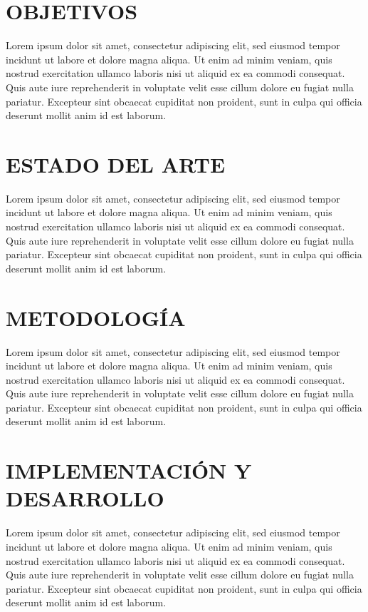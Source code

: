 \documentclass[12pt,a4paper,twoside]{article} %
\begin{document}
\section{OBJETIVOS}
\label{sec:objetivos}

Lorem ipsum dolor sit amet, consectetur adipiscing elit, sed eiusmod tempor incidunt ut labore et dolore magna aliqua. Ut enim ad minim veniam, quis nostrud exercitation ullamco laboris nisi ut aliquid ex ea commodi consequat. Quis aute iure reprehenderit in voluptate velit esse cillum dolore eu fugiat nulla pariatur. Excepteur sint obcaecat cupiditat non proident, sunt in culpa qui officia deserunt mollit anim id est laborum.


\section{ESTADO DEL ARTE}
\label{sec:stateofart}

Lorem ipsum dolor sit amet, consectetur adipiscing elit, sed eiusmod tempor incidunt ut labore et dolore magna aliqua. Ut enim ad minim veniam, quis nostrud exercitation ullamco laboris nisi ut aliquid ex ea commodi consequat. Quis aute iure reprehenderit in voluptate velit esse cillum dolore eu fugiat nulla pariatur. Excepteur sint obcaecat cupiditat non proident, sunt in culpa qui officia deserunt mollit anim id est laborum.


\section{METODOLOGÍA}
\label{sec:metodologias}

Lorem ipsum dolor sit amet, consectetur adipiscing elit, sed eiusmod tempor incidunt ut labore et dolore magna aliqua. Ut enim ad minim veniam, quis nostrud exercitation ullamco laboris nisi ut aliquid ex ea commodi consequat. Quis aute iure reprehenderit in voluptate velit esse cillum dolore eu fugiat nulla pariatur. Excepteur sint obcaecat cupiditat non proident, sunt in culpa qui officia deserunt mollit anim id est laborum.


\section{IMPLEMENTACIÓN Y DESARROLLO}
\label{sec:implementacionydesarrollo}

Lorem ipsum dolor sit amet, consectetur adipiscing elit, sed eiusmod tempor incidunt ut labore et dolore magna aliqua. Ut enim ad minim veniam, quis nostrud exercitation ullamco laboris nisi ut aliquid ex ea commodi consequat. Quis aute iure reprehenderit in voluptate velit esse cillum dolore eu fugiat nulla pariatur. Excepteur sint obcaecat cupiditat non proident, sunt in culpa qui officia deserunt mollit anim id est laborum.
\end{document}
